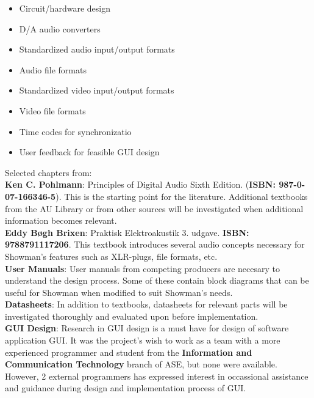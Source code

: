 \begin{itemize}
\item Circuit/hardware design
\item D/A audio converters
\item Standardized audio input/output formats
\item Audio file formats
\item Standardized video input/output formats
\item Video file formats
\item Time codes for synchronizatio
\item User feedback for feasible GUI design
\end{itemize}

Selected chapters from: \\
\textbf{Ken C. Pohlmann}: Principles of Digital Audio Sixth Edition. (\textbf{ISBN: 987-0-07-166346-5}). This is the starting point for the literature. Additional textbooks from the AU Library or from other sources will be investigated when additional information becomes relevant. \\

\textbf{Eddy Bøgh Brixen}: Praktisk Elektroakustik 3. udgave. \textbf{ISBN: 9788791117206}. This textbook introduces several audio concepts necessary for Showman's features such as XLR-plugs, file formats, etc. \\ 

\textbf{User Manuals}: User manuals from competing producers are necesary to understand the design process. Some of these contain block diagrams that can be useful for Showman when modified to suit Showman's needs. \\

\textbf{Datasheets}: In addition to textbooks, datasheets for relevant parts will be investigated thoroughly and evaluated upon before implementation. \\

\textbf{GUI Design}: Research in GUI design is a must have for design of software application GUI. It was the project's wish to work as a team with a more experienced programmer and student from the \textbf{Information and Communication Technology} branch of ASE, but none were available. However, 2 external programmers has expressed interest in occassional assistance and guidance during design and implementation process of GUI.